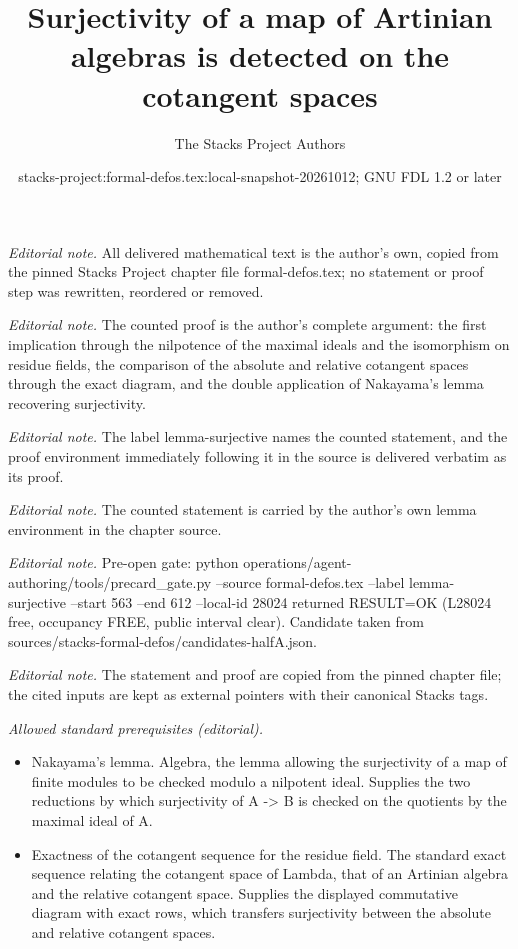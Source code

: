 \documentclass[10pt,a4paper]{amsart}
\title{Surjectivity of a map of Artinian algebras is detected on the cotangent spaces}
\author{The Stacks Project Authors}
\date{stacks-project:formal-defos.tex:local-snapshot-20261012; GNU FDL 1.2 or later}
\theoremstyle{plain}
\theoremstyle{definition}
\theoremstyle{remark}
\numberwithin{equation}{subsection}
\begin{document}
\maketitle
\noindent\textit{Editorial note.} All delivered mathematical text is the author's own, copied from the pinned Stacks Project chapter file formal-defos.tex; no statement or proof step was rewritten, reordered or removed.\par\medskip
\noindent\textit{Editorial note.} The counted proof is the author's complete argument: the first implication through the nilpotence of the maximal ideals and the isomorphism on residue fields, the comparison of the absolute and relative cotangent spaces through the exact diagram, and the double application of Nakayama's lemma recovering surjectivity.\par\medskip
\noindent\textit{Editorial note.} The label lemma-surjective names the counted statement, and the proof environment immediately following it in the source is delivered verbatim as its proof.\par\medskip
\noindent\textit{Editorial note.} The counted statement is carried by the author's own lemma environment in the chapter source.\par\medskip
\noindent\textit{Editorial note.} Pre-open gate: python operations/agent-authoring/tools/precard\_gate.py --source formal-defos.tex --label lemma-surjective --start 563 --end 612 --local-id 28024 returned RESULT=OK (L28024 free, occupancy FREE, public interval clear). Candidate taken from sources/stacks-formal-defos/candidates-halfA.json.\par\medskip
\noindent\textit{Editorial note.} The statement and proof are copied from the pinned chapter file; the cited inputs are kept as external pointers with their canonical Stacks tags.\par\medskip
\noindent\textit{Allowed standard prerequisites (editorial).}\begin{itemize}
\item Nakayama's lemma. Algebra, the lemma allowing the surjectivity of a map of finite modules to be checked modulo a nilpotent ideal. Supplies the two reductions by which surjectivity of A -> B is checked on the quotients by the maximal ideal of A.
\item Exactness of the cotangent sequence for the residue field. The standard exact sequence relating the cotangent space of Lambda, that of an Artinian algebra and the relative cotangent space. Supplies the displayed commutative diagram with exact rows, which transfers surjectivity between the absolute and relative cotangent spaces.
\end{itemize}\medskip
\end{document}
